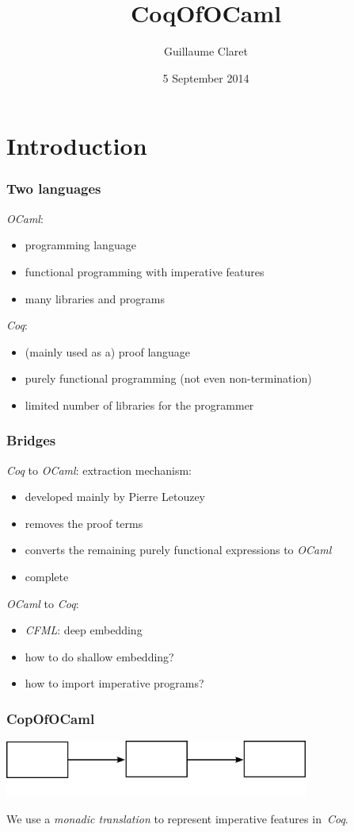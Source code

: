 \documentclass[hyperref={pdfpagelabels=false}]{beamer}
\begin{document}
  \title{CoqOfOCaml}
  \author{Guillaume Claret}
  \date{5 September 2014}
  \maketitle

  \section{Introduction}
  \begin{frame}
    \frametitle{Two languages}
    \emph{OCaml}:
    \begin{itemize}
      \item programming language
      \item functional programming with imperative features
      \item many libraries and programs
    \end{itemize}
    \emph{Coq}:
    \begin{itemize}
      \item (mainly used as a) proof language
      \item purely functional programming (not even non-termination)
      \item limited number of libraries for the programmer
    \end{itemize}
  \end{frame}
  \begin{frame}
    \frametitle{Bridges}
    \emph{Coq} to \emph{OCaml}: extraction mechanism:
    \begin{itemize}
      \item developed mainly by Pierre Letouzey
      \item removes the proof terms
      \item converts the remaining purely functional expressions to \emph{OCaml}
      \item complete
    \end{itemize}
    \emph{OCaml} to \emph{Coq}:
    \begin{itemize}
      \item \emph{CFML}: deep embedding
      \item how to do shallow embedding?
      \item how to import imperative programs?
    \end{itemize}
  \end{frame}
  \begin{frame}
    \frametitle{CopOfOCaml}
    \begin{center}
      \includegraphics[width=10cm]{images/compilation_chain}
    \end{center}
    We use a \emph{monadic translation} to represent imperative features in~\emph{Coq}.
  \end{frame}
\end{document}
